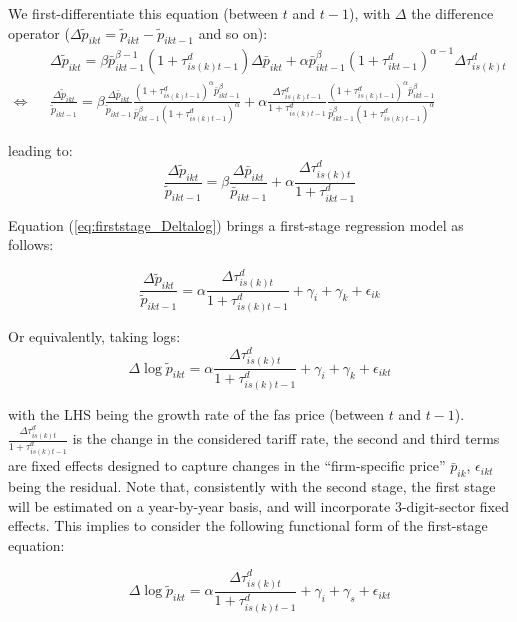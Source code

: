 \documentclass[a4paper,11pt]{article}
\begin{document}
We first-differentiate this equation (between $t$ and $t-1$), with $\Delta $ the difference operator ($\Delta\widetilde{p}_{ikt} = \widetilde{p}_{ikt} - \widetilde{p}_{ikt-1}$ and so on):
\begin{eqnarray*}
&&\Delta \widetilde{p}_{ikt} = \beta \bar{p}_{ikt-1}^{\beta-1}(1+\tau^d_{is(k)t-1})\Delta \bar{p}_{ikt} + \alpha \bar{p}^\beta_{ikt-1} (1+\tau^d_{ikt-1})^{\alpha-1}\Delta \tau^d_{is(k)t}  \\
\Leftrightarrow &&\frac{\Delta \widetilde{p}_{ikt}}{\widetilde{p}_{ikt-1}} = \beta \frac{\Delta \bar{p}_{ikt}}{\widetilde{p}_{ikt-1}} \frac{(1+\tau^d_{is(k)t-1})^\alpha \bar{p}_{ikt-1}^\beta}{\bar{p}^\beta_{ikt-1}(1+\tau^d_{is(k)t-1})^\alpha} +\alpha \frac{\Delta \tau^d_{is(k)t-1}}{1+\tau_{is(k)t-1}^d}\frac{(1+\tau^d_{is(k)t-1})^\alpha \bar{p}_{ikt-1}^\beta}{\bar{p}^\beta_{ikt-1}(1+\tau^d_{is(k)t-1})^\alpha} \end{eqnarray*}

leading to:
\begin{equation}
\frac{\Delta \widetilde{p}_{ikt}}{\widetilde{p}_{ikt-1}} =  \beta \frac{\Delta \bar{p}_{ikt}}{\bar{p}_{ikt-1}} +\alpha\frac{\Delta \tau^d_{is(k)t}}{1+\tau_{ikt-1}^d} \label{eq:firststage_Deltalog}
\end{equation}

Equation (\ref{eq:firststage_Deltalog}) brings a first-stage regression model as follows:

$$\frac{\Delta \widetilde{p}_{ikt}}{\widetilde{p}_{ikt-1}} = \alpha \frac{\Delta \tau^d_{is(k)t}}{1+\tau_{is(k)t-1}^d} + \gamma_{i} +\gamma_{k}+\epsilon_{ik}$$

Or equivalently, taking logs:
$$\Delta \log \widetilde{p}_{ikt}= \alpha\frac{\Delta \tau^d_{is(k)t}}{1+\tau_{is(k)t-1}^d} +\gamma_{i} +\gamma_{k}+\epsilon_{ikt}$$


\noindent with the LHS being the growth rate of the fas price (between $t$ and $t-1$). $\frac{\Delta \tau^d_{is(k)t}}{1+\tau_{is(k)t-1}^d}$ is the change in the considered tariff rate, the second and third terms are fixed effects designed to capture changes in the ``firm-specific price'' $\bar{p}_{ik}$, $\epsilon_{ikt}$ being the residual. Note that, consistently with the second stage, the first stage will be estimated on a year-by-year basis, and will incorporate 3-digit-sector fixed effects. This implies to consider the following functional form of the first-stage equation:

\begin{equation}
\Delta \log \widetilde{p}_{ikt} = \alpha\frac{\Delta \tau^d_{is(k)t}}{1+\tau_{is(k)t-1}^d} +\gamma_{i} +\gamma_{s}+\epsilon_{ikt} \label{eq:firststage_Deltalog}
\end{equation}
\end{document}
